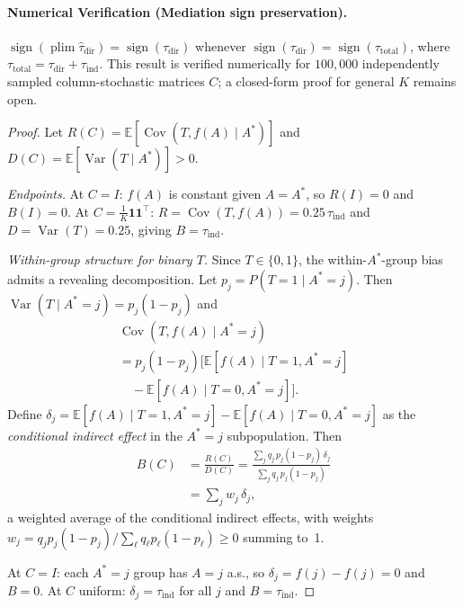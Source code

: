 \paragraph{Numerical Verification (Mediation sign preservation).}
\label{find:med_sign}
$\operatorname{sign}(\operatorname{plim}\hat\tau_{\mathrm{dir}})=\operatorname{sign}(\tau_{\mathrm{dir}})$ whenever $\operatorname{sign}(\tau_{\mathrm{dir}})=\operatorname{sign}(\tau_{\mathrm{total}})$, where $\tau_{\mathrm{total}}=\tau_{\mathrm{dir}}+\tau_{\mathrm{ind}}$.
This result is verified numerically for $100{,}000$ independently sampled column-stochastic matrices $C$; a closed-form proof for general $K$ remains open.

\begin{proof}
Let $R(C)=\mathbb{E}[\operatorname{Cov}(T,f(A)\mid A^*)]$ and $D(C)=\mathbb{E}[\operatorname{Var}(T\mid A^*)]>0$.

\emph{Endpoints.}
At $C{=}I$: $f(A)$ is constant given $A{=}A^*$, so $R(I)=0$ and $B(I)=0$.
At $C=\frac{1}{K}\mathbf{1}\mathbf{1}^\top$: $R=\operatorname{Cov}(T,f(A))=0.25\,\tau_{\mathrm{ind}}$ and $D=\operatorname{Var}(T)=0.25$, giving $B=\tau_{\mathrm{ind}}$.

\emph{Within-group structure for binary $T$.}
Since $T\in\{0,1\}$, the within-$A^*$-group bias admits a revealing decomposition.
Let $p_j=P(T{=}1\mid A^*{=}j)$.
Then $\operatorname{Var}(T\mid A^*{=}j)=p_j(1{-}p_j)$ and
\begin{multline*}
  \operatorname{Cov}(T,f(A)\mid A^*{=}j)\\
  = p_j(1{-}p_j)\bigl[\mathbb{E}[f(A)\mid T{=}1,A^*{=}j]\\
  \quad{}-\mathbb{E}[f(A)\mid T{=}0,A^*{=}j]\bigr].
\end{multline*}
Define $\delta_j=\mathbb{E}[f(A)\mid T{=}1,A^*{=}j]-\mathbb{E}[f(A)\mid T{=}0,A^*{=}j]$ as the \emph{conditional indirect effect} in the $A^*{=}j$ subpopulation.
Then
\begin{align*}
  B(C)&=\frac{R(C)}{D(C)}
  =\frac{\sum_j q_j\,p_j(1{-}p_j)\,\delta_j}{\sum_j q_j\,p_j(1{-}p_j)}\\
  &=\textstyle\sum_j w_j\,\delta_j,
\end{align*}
a weighted average of the conditional indirect effects, with weights
$w_j=q_j p_j(1{-}p_j)\big/\!\sum_\ell q_\ell p_\ell(1{-}p_\ell)\geq 0$
summing to~1.

At $C{=}I$: each $A^*{=}j$ group has $A{=}j$ a.s., so $\delta_j=f(j)-f(j)=0$ and $B=0$.
At $C$ uniform: $\delta_j=\tau_{\mathrm{ind}}$ for all $j$ and $B=\tau_{\mathrm{ind}}$.


\end{proof}

